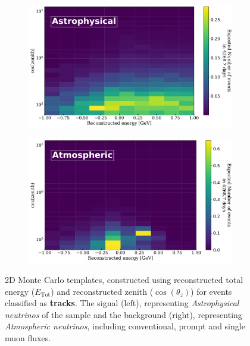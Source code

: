 \begin{figure}[h!]
    \begin{subfigure}[h]{0.72\textwidth}
        \includegraphics{./figures/Analysis/Tracks_Astrophysical.pdf}
    \end{subfigure}
    \hfill
    \begin{subfigure}[h]{0.72\textwidth}
        \includegraphics{./figures/Analysis/Tracks_Atmospheric.pdf}
       
    \end{subfigure}%
    \caption{2D Monte Carlo templates, constructed using reconstructed total energy ($E_{\text{Tot}}$) and reconstructed zenith ($\cos(\theta_z)$) for events classified as \textbf{tracks}. The signal (left), representing \emph{Astrophysical neutrinos} of the sample and the background (right), representing \emph{Atmospheric neutrinos}, including conventional, prompt and single muon fluxes.}
\end{figure}

